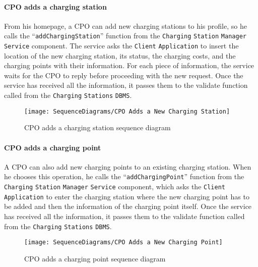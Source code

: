 \paragraph{CPO adds a charging station}
From his homepage, a CPO can add new charging stations to his profile, so he calls the ``\verb|addChargingStation|'' function from the \verb|Charging| \verb|Station| \verb|Manager| \verb|Service| component.
The service asks the \verb|Client| \verb|Application| to insert the location of the new charging station, its status, the charging costs, and the charging points with their information.
For each piece of information, the service waits for the CPO to reply before proceeding with the new request.
Once the service has received all the information, it passes them to the validate function called from the \verb|Charging| \verb|Stations| \verb|DBMS|\@.
\begin{figure}[H]
    \begin{center}
        \texttt{[image: SequenceDiagrams/CPO Adds a New Charging Station]}
        \caption{CPO adds a charging station sequence diagram}
        \label{cpo_adds_new_charging_station}
    \end{center}
\end{figure}

\paragraph{CPO adds a charging point}
A CPO can also add new charging points to an existing charging station.
When he chooses this operation, he calls the ``\verb|addChargingPoint|'' function from the \verb|Charging| \verb|Station| \verb|Manager| \verb|Service| component, which asks the \verb|Client| \verb|Application| to enter the charging station where the new charging point has to be added and then the information of the charging point itself.
Once the service has received all the information, it passes them to the validate function called from the \verb|Charging| \verb|Stations| \verb|DBMS|\@.
\begin{figure}[H]
    \begin{center}
        \texttt{[image: SequenceDiagrams/CPO Adds a New Charging Point]}
        \caption{CPO adds a charging point sequence diagram}
        \label{cpo_adds_new_charging_point}
    \end{center}
\end{figure}

